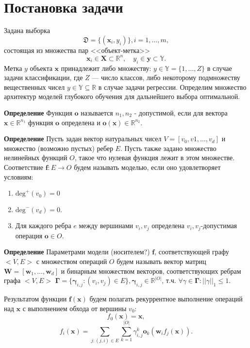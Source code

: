 \documentclass[12pt]{article}
\begin{document}
\clearpage
\section{Постановка задачи}
Задана выборка  \begin{equation}\label{eq:dataset}\mathfrak{D} = \{(\mathbf{x}_i,y_i)\}, i = 1,\dots,m,\end{equation} состоящая из множества пар <<объект-метка>> $$\mathbf{x}_i \in \mathbf{X} \subset \mathbb{R}^n, \quad {y}_i \in \mathbf{y} \subset \mathbb{Y}.$$ Метка ${y}$  объекта $\mathbf{x}$ принадлежит либо множеству: ${y} \in \mathbb{Y} = \{1, \dots, Z\}$ в случае задачи классификации, где $Z$ --- число классов, либо некоторому подмножеству вещественных чисел ${y} \in \mathbb{Y}  \subseteq \mathbb{R}$ в случае задачи регрессии. Определим множество архитектур моделей глубокого обучения для дальнейшего выбора оптимальной. 

\textbf{Определение} Функция $\mathbf{o}$ называется $n_1,n_2$ - допустимой, если для вектора $\mathbf{x} \in \mathbb{R}^{n_1}$ функция $\mathbf{o}$ определена и $\mathbf{o}(\mathbf{x}) \in \mathbb{R}^{n_2}$.


\textbf{Определение} Пусть задан вектор натуральных чисел  $V = [v_0, v1,\dots,v_d]$ и множество (возможно пустых) ребер $E$.
Пусть также задано множество нелинейных функций ${O}$, такое что нулевая функция лежит в этом множестве.
Соответствие $\mathbf{f}: E \to O$ будем называть моделью, если оно удовлетворяет условиям:
\begin{enumerate}
\item $\text{deg}^{+}({v}_0) = 0$
\item $\text{deg}^{-}({v}_d) = 0$.
\item Для каждого ребра $e$ между вершинами $v_i,v_j$ определена $v_i, v_j$-допустимая операция $\mathbf{o} \in O$.  
\end{enumerate}

\textbf{Определение} Параметрами модели (носителем?) $\mathbf{f}$, соответствующей графу $<V,E>$ с множеством операций $O$ будем называть вектор матриц $\mathbf{W} = [\mathbf{w}_1, \dots, \mathbf{w}_d]$ и бинарным множеством векторов, соответствующих ребрам графа $<V,E>$  $\boldsymbol{\Gamma} = \{\boldsymbol{\gamma}_{i,j}: (v_i,v_j) \in E \}, \boldsymbol{\gamma}_{i,j} \in \mathbb{R}^{|O|}$, т.ч. $\forall \gamma \in \boldsymbol{\Gamma}: ||\gamma||_1 \leq 1$.

Результатом функции $\mathbf{f}(\mathbf{x})$ будем полагать рекуррентное выполнение операций над $\mathbf{x}$ с выполнением обхода от вершины $v_0$:
\[
    f_0(\mathbf{x}) = \mathbf{x},
\]
\[
    f_i(\mathbf{x}) = \sum_{j: (j,i) \in E} \sum_{k = 1}^{|O|} {\gamma}^k_{i,j} \mathbf{o}_{k}  (\mathbf{w}_i f_j(\mathbf{x})). 
\]
\end{document}
